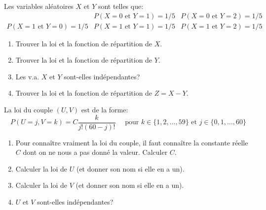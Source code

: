 \documentclass[a4paper,12pt,reqno]{amsart}
\begin{document}


\begin{exo}

  Les variables aléatoires $X$ et $Y$ sont telles que:
    $$
      \begin{array}{ccc}
                                   & P(X=0 \text{ et } Y=1)=1/5 & P(X=0 \text{ et } Y=2)=1/5 \\
        P(X=1 \text{ et } Y=0)=1/5 & P(X=1 \text{ et } Y=1)=1/5 & P(X=1 \text{ et } Y=2)=1/5
      \end{array}
    $$
  \begin{enumerate}
    \item Trouver la loi et la fonction de répartition de $X$.
    \item Trouver la loi et la fonction de répartition de $Y$.
    \item Les v.a. $X$ et $Y$ sont-elles indépendantes?
    \item Trouver la loi et la fonction de répartition de $Z = X-Y$.
  \end{enumerate}

\end{exo}

\begin{exo}

  La loi du couple $(U,V)$ est de la forme:
    $$
      P(U=j,V=k)=C\frac{k}{j!(60-j)!} \quad\text{ pour } k\in\{1,2,\ldots,59\} \text{ et } j\in\{0,1,\ldots,60\}
    $$
  \begin{enumerate}
    \item Pour connaître vraiment la loi du couple, il faut connaître la constante réelle $C$ dont on ne nous a pas donné la valeur. Calculer $C$.
    \item Calculer la loi de $U$ (et donner son nom si elle en a un).
    \item Calculer la loi de $V$ (et donner son nom si elle en a un).
    \item $U$ et $V$ sont-elles indépendantes?
  \end{enumerate}

\end{exo}
\end{document}
